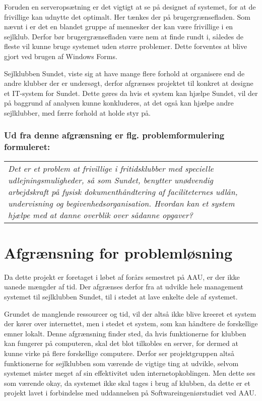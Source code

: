 Foruden en serveropsætning er det vigtigt at se på designet af systemet, for at de frivillige kan udnytte det
optimalt. Her tænkes der på brugergrænsefladen. Som nævnt i 
er det en blandet gruppe af mennesker der kan være frivillige i en sejlklub. Derfor bør brugergrænsefladen
være nem at finde rundt i, således de fleste vil kunne bruge systemet uden større problemer. Dette
forventes at blive gjort ved brugen af Windows Forms.

Sejlklubben Sundet, viste sig at have mange flere forhold at organisere end de andre klubber der er undersøgt,
derfor afgrænses projektet til konkret at designe et IT-system for Sundet. Dette gøres da hvis et system kan
hjælpe Sundet, vil der på baggrund af analysen kunne konkluderes, at det også kan hjælpe andre sejlklubber,
med færre forhold at holde styr på.

\subsubsection*{Ud fra denne afgrænsning er flg. problemformulering formuleret:}

\begin{center}
  \begin{tabular}{|p{14cm}|}
    \textit{Det er et problem at frivillige i fritidsklubber med specielle udlejningsmuligheder, så som Sundet, benytter unødvendig arbejdskraft på fysisk dokumenthåndtering af faciliteternes udlån, undervisning og begivenhedsorganisation. Hvordan kan et system hjælpe med at danne overblik over sådanne opgaver?}
  \end{tabular}
\end{center}


\section{Afgrænsning for problemløsning}

Da dette projekt er foretaget i løbet af forårs semestret på AAU, er der ikke uanede mængder af tid. Der
afgrænses derfor fra at udvikle hele management systemet til sejlklubben Sundet, til i stedet at lave enkelte
dele af systemet.

Grundet de manglende ressourcer og tid, vil der altså ikke blive kreeret et system der kører over internettet,
men i stedet et system, som kan håndtere de forskellige emner lokalt. Denne afgrænsning finder sted, da hvis
funktionerne for klubben kan fungerer på computeren, skal det blot tilkobles en server, for dermed at kunne
virke på flere forskellige computere. Derfor ser projektgruppen altså funktionerne for sejlklubben som værende
de vigtige ting at udvikle, selvom systemet mister meget af sin effektivitet uden internetopkoblingen. Men
dette ses som værende okay, da systemet ikke skal tages i brug af klubben, da dette er et projekt lavet i
forbindelse med uddannelsen på Softwareingeniørstudiet ved AAU.

